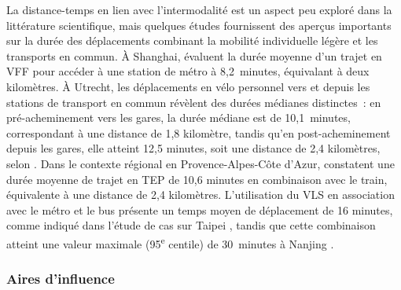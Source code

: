 \begin{refsegment}
La distance-temps en lien avec l'intermodalité est un aspect peu exploré dans la littérature scientifique, mais quelques études fournissent des aperçus importants sur la durée des déplacements combinant la mobilité individuelle légère et les transports en commun. À Shanghai, \textcolor{blue}{\textcite[19]{lin_analysis_2019}} évaluent la durée moyenne d'un trajet en \acrshort{VFF} pour accéder à une station de métro à 8,2~minutes, équivalant à deux kilomètres. À Utrecht, les déplacements en vélo personnel vers et depuis les stations de transport en commun révèlent des durées médianes distinctes~: en pré-acheminement vers les gares, la durée médiane est de 10,1~minutes, correspondant à une distance de 1,8 kilomètre, tandis qu'en post-acheminement depuis les gares, elle atteint 12,5 minutes, soit une distance de 2,4 kilomètres, selon \textcolor{blue}{\textcite[268]{krygsman_multimodal_2004}}. Dans le contexte régional en Provence-Alpes-Côte d'Azur, \textcolor{blue}{\textcite[186]{moinse_intermodal_2022}} constatent une durée moyenne de trajet en \acrshort{TEP} de 10,6 minutes en combinaison avec le train, équivalente à une distance de 2,4 kilomètres. L'utilisation du \acrshort{VLS} en association avec le métro et le bus présente un temps moyen de déplacement de 16 minutes, comme indiqué dans l'étude de cas sur Taipei \textcolor{blue}{\autocite[49]{lu_improving_2018}}, tandis que cette combinaison atteint une valeur maximale (95\textsuperscript{e} centile) de 30~minutes à Nanjing \textcolor{blue}{\autocite[64]{ma_understanding_2018}}.%

\subsubsection*{Aires d'influence
    \label{chap2:aires-influence}
    }
    

\end{refsegment}
